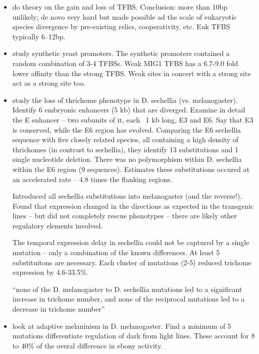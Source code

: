 \documentclass[9 pt]{article}
\begin{document}
\begin{itemize}
    \item \citet{tugrul2015dyanmics} do theory on the gain and loss of TFBS.  
        Conclusion: more than 10bp unlikely; de novo very hard but made possible ad the scale of eukaryotic species divergence by pre-existing relics, cooperativity, etc.
        Euk TFBS typically 6--12bp.

  \item \citet{gertz2009analysis} study synthetic yeast promoters. The synthetic promoters contained a random combination of 3-4 TFBSs. Weak MIG1 TFBS has a 6.7-9.0 fold lower affinity than the strong TFBS. Weak sites in concert with a strong site act as a strong site too. 


  \item \citet{frankel2011morphological} study the loss of thrichome phenotype in D. sechellia (vs. melanogaster). Identify 6 embryonic enhancers (5 kb) that are diverged. Examine in detail the E enhancer -- two subunits of it, each ~1 kb long, E3 and E6. Say that E3 is conserved, while the E6 region has evolved. Comparing the E6 sechellia sequence with five closely related species, all containing a high density of thrichomes (in contrast to sechellia), they identify 13 substitutions and 1 single nucleotide deletion. There was no polymorphism within D. sechellia within the E6 region (9 sequences). Estimates these substitutions occured at an accelerated rate -- 4.8 times the flanking regions. 

    Introduced all sechellia substitutions into melanogaster (and the reverse!). Found that expression changed in the directions as expected in the transgenic lines -- but did not completely rescue phenotypes -- there are likely other regulatory elements involved. 

    The temporal expression delay in sechellia could not be captured by a single mutation -- only a combination of the known differences. At least 5 substituitons are necessary. Each cluster of mutations (2-5) reduced trichome expression by 4.6-33.5\%. 

    ``none of the D. melanogaster to D. sechellia mutations led to a significant increase in trichome number, and none of the reciprocal mutations led to a decrease in trichome number''

  \item \citet{rebeiz2009stepwise} look at adaptive melaninism in D. melanogaster. 
    Find a minimum of 5 mutations differentiate regulation of dark from light lines. These account for 8 to 40\% of the overal difference in ebony activity. 


\end{itemize}
\end{document}
